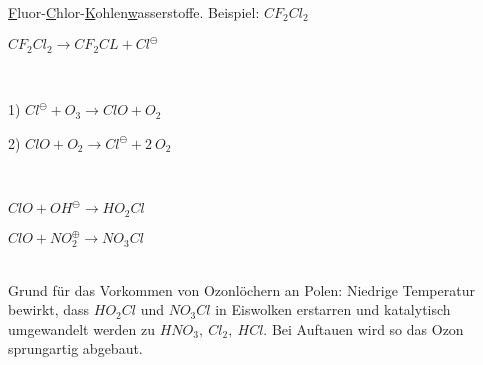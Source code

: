 \begin{definition}[FCKW]
	\underline{F}luor-\underline{C}hlor-\underline{K}ohlen\underline{w}asserstoffe. Beispiel: $CF_2Cl_2$
\end{definition}

\begin{definition}
	{\large
		$CF_2Cl_2 \rightarrow CF_2CL + Cl^\ominus$
	}
\end{definition}

\begin{definition}[Ozonabbaukreislauf]\leavevmode \\
	{\large
		1) $Cl^\ominus + O_3 \rightarrow ClO + O_2$	
		
		2) $ClO + O_2 \rightarrow Cl^\ominus + 2 \ O_2$
	}
\end{definition}

\begin{definition}\leavevmode \\
	{\large
		$ClO +  OH^\ominus \rightarrow HO_2Cl$
		
		$ClO + NO_2^\oplus \rightarrow NO_3Cl$	
	}
\end{definition}
\leavevmode \\
Grund für das Vorkommen von Ozonlöchern an Polen: Niedrige Temperatur bewirkt, dass $HO_2Cl$ und $NO_3Cl$ in Eiswolken erstarren und katalytisch umgewandelt werden zu $HNO_3,\ Cl_2,\ HCl$. Bei Auftauen wird so das Ozon sprungartig abgebaut.